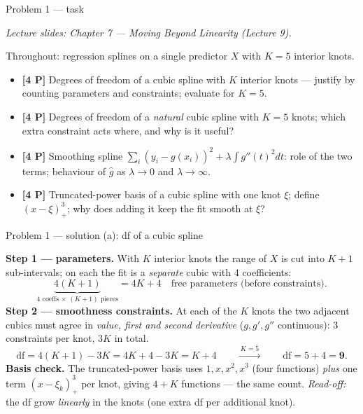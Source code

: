 \documentclass[aspectratio=169,11pt]{beamer}
\begin{document}
\begin{frame}{Problem 1 --- task}
  \begin{exercise}
    {\scriptsize\itshape Lecture slides: Chapter 7 --- Moving Beyond Linearity (Lecture 9).}\par\smallskip
    Throughout: regression splines on a single predictor $X$ with $K=5$ interior knots.
    \begin{itemize}
      \item[(a)] \textbf{[4 P]} Degrees of freedom of a cubic spline with $K$ interior knots ---
        justify by counting parameters and constraints; evaluate for $K=5$.
      \item[(b)] \textbf{[4 P]} Degrees of freedom of a \emph{natural} cubic spline with $K=5$
        knots; which extra constraint acts where, and why is it useful?
      \item[(c)] \textbf{[4 P]} Smoothing spline
        $\sum_i (y_i-g(x_i))^2+\lambda\int g''(t)^2dt$: role of the two terms;
        behaviour of $\hat g$ as $\lambda\to 0$ and $\lambda\to\infty$.
      \item[(d)] \textbf{[4 P]} Truncated-power basis of a cubic spline with one knot $\xi$;
        define $(x-\xi)^3_+$; why does adding it keep the fit smooth at $\xi$?
    \end{itemize}
  \end{exercise}
\end{frame}

\begin{frame}{Problem 1 --- solution (a): df of a cubic spline}
  \begin{solutionbox}
    \textbf{Step 1 --- parameters.} With $K$ interior knots the range of $X$ is cut into $K+1$
    sub-intervals; on each the fit is a \emph{separate} cubic with $4$ coefficients:
    \[
      \underbrace{4(K+1)}_{\text{4 coeffs}\,\times\,(K+1)\text{ pieces}}=4K+4\quad\text{free parameters (before constraints).}
    \]
    \textbf{Step 2 --- smoothness constraints.} At each of the $K$ knots the two adjacent cubics
    must agree in \emph{value, first and second derivative} ($g,g',g''$ continuous): $3$ constraints
    per knot, $3K$ in total.
    \[
      \mathrm{df}=4(K+1)-3K=4K+4-3K=\boxed{K+4}
      \qquad\xrightarrow{\ K=5\ }\qquad \mathrm{df}=5+4=\mathbf{9}.
    \]
    \textbf{Basis check.} The truncated-power basis uses $1,x,x^2,x^3$ (four functions) \emph{plus}
    one term $(x-\xi_k)^3_+$ per knot, giving $4+K$ functions --- the same count.
    \emph{Read-off:} the df grow \emph{linearly} in the knots (one extra df per additional knot).
  \end{solutionbox}
\end{frame}
\end{document}
